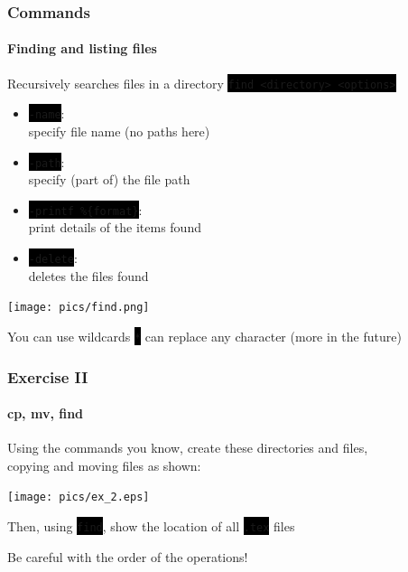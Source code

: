 \documentclass[unknownkeysallowed, 10pt, a4 paper, handout]{beamer}
\newcommand{\code}[1]{\colorbox{black}{\color{green}\texttt{#1}}}
\newcommand{\sidebyside}[5]{
  \begin{minipage}{#1\textwidth}
    #2
  \end{minipage} #3 \begin{minipage}{#4\textwidth}
    #5
  \end{minipage}
}
\begin{document}
\begin{frame}
  \frametitle{Commands}
  \framesubtitle{Finding and listing files}

  \begin{exampleblock}{Recursively searches files in a directory}
  \code{find <directory> <options>}
  \end{exampleblock}

  \sidebyside{0.52}{
     \begin{itemize}
      \item \code{-name}:\\
        specify file name (no paths here)
      \item \code{-path}:\\
        specify (part of) the file path
      \item \code{-printf \%\{format\}}:\\
        print details of the items found
      \item \code{-delete}:\\
        deletes the files found
    \end{itemize}
  }{\hfill}{0.45}{
    \begin{center}
      \texttt{[image: pics/find.png]}
    \end{center}
  }

  \begin{alertblock}{You can use wildcards}
  \code{*} can replace any character (more in the future)
  \end{alertblock}
\end{frame}


\begin{frame}
  \frametitle{Exercise II}
  \framesubtitle{cp, mv, find}
  \begin{block}{}
    Using the commands you know, create these directories and files,\\
    copying and moving files as shown:

    \begin{center}
      \texttt{[image: pics/ex\_2.eps]}
    \end{center}

    Then, using \code{find}, show the location of all \code{.tex} files
  \end{block}
  \begin{alertblock}{}
    Be careful with the order of the operations!
  \end{alertblock}
\end{frame}
\end{document}
